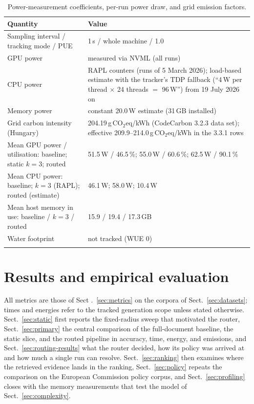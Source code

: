 \documentclass[pdflatex,sn-mathphys-num]{sn-jnl}
\newcommand{\gco}{g\,CO$_2$eq}
\theoremstyle{thmstyleone}%
\theoremstyle{thmstylethree}%
\begin{document}
\begin{table}[htbp]
\caption{Power-measurement coefficients, per-run power draw, and grid emission factors.}\label{tab:power}
\begin{tabular}{@{}p{5.5cm}p{7.1cm}@{}}
\toprule
Quantity & Value \\
\midrule
Sampling interval / tracking mode / PUE & 1\,s / whole machine / 1.0 \\
GPU power & measured via NVML (all runs) \\
CPU power & RAPL counters (runs of 5 March 2026); load-based estimate with the tracker's TDP fallback (``4\,W per thread $\times$ 24 threads $=$ 96\,W'') from 19 July 2026 on \\
Memory power & constant 20.0\,W estimate (31\,GB installed) \\
Grid carbon intensity (Hungary) & 204.19\,\gco{}/kWh (CodeCarbon 3.2.3 data set); effective 209.9--214.0\,\gco{}/kWh in the 3.3.1 rows \\
Mean GPU power / utilisation: baseline; static $k=3$; routed & 51.5\,W / 46.5\,\%; 55.0\,W / 60.6\,\%; 62.5\,W / 90.1\,\% \\
Mean CPU power: baseline; $k=3$ (RAPL); routed (estimate) & 46.1\,W; 58.0\,W; 10.4\,W \\
Mean host memory in use: baseline / $k=3$ / routed & 15.9 / 19.4 / 17.3\,GB \\
Water footprint & not tracked (WUE 0) \\
\botrule
\end{tabular}
\end{table}

\section{Results and empirical evaluation}\label{sec:results}

All metrics are those of Sect .~\ref {sec:metrics} on the corpora of Sect.~\ref{sec:datasets}; times and energies refer to the tracked generation scope unless stated otherwise. Sect.~\ref{sec:static} first reports the fixed-radius sweep that motivated the router, Sect.~\ref{sec:primary} the central comparison of the full-document baseline, the static slice, and the routed pipeline in accuracy, time, energy, and emissions, and Sect.~\ref{sec:routing-results} what the router decided, how its policy was arrived at and how much a single run can resolve. Sect.~\ref{sec:ranking} then examines where the retrieved evidence lands in the ranking, Sect.~\ref{sec:policy} repeats the comparison on the European Commission policy corpus, and Sect.~\ref{sec:profiling} closes with the memory measurements that test the model of Sect.~\ref{sec:complexity}.
\end{document}
